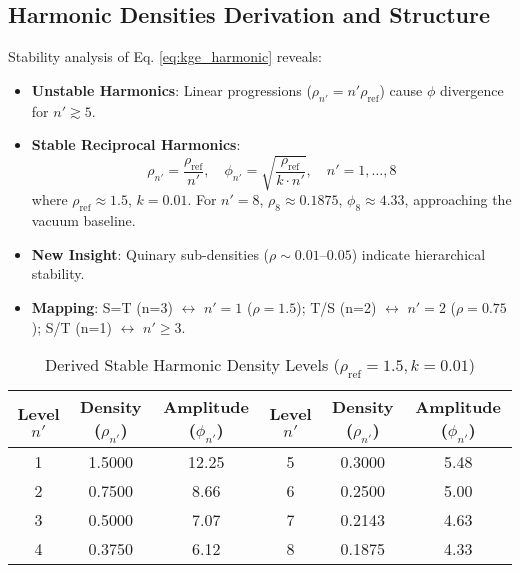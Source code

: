 \documentclass[11pt]{article}
\begin{document}
\subsection{Harmonic Densities Derivation and Structure}
Stability analysis of Eq. \ref{eq:kge_harmonic} reveals:
\begin{itemize}
    \item \textbf{Unstable Harmonics}: Linear progressions (\(\rho_{n'} = n' \rho_{\text{ref}}\)) cause \(\phi\) divergence for \(n' \gtrsim 5\).
    \item \textbf{Stable Reciprocal Harmonics}:
        \begin{equation}
        \rho_{n'} = \frac{\rho_{\text{ref}}}{n'}, \quad \phi_{n'} = \sqrt{\frac{\rho_{\text{ref}}}{k \cdot n'}}, \quad n' = 1, \ldots, 8
        \end{equation}
        where \(\rho_{\text{ref}} \approx 1.5\), \(k = 0.01\). For \(n' = 8\), \(\rho_8 \approx 0.1875\), \(\phi_8 \approx 4.33\), approaching the vacuum baseline.
    \item \textbf{New Insight}: Quinary sub-densities (\(\rho \sim 0.01–0.05\)) indicate hierarchical stability.
    \item \textbf{Mapping}: S=T (n=3) \(\leftrightarrow\) \(n'=1\) (\(\rho = 1.5\)); T/S (n=2) \(\leftrightarrow\) \(n'=2\) (\(\rho = 0.75\)); S/T (n=1) \(\leftrightarrow\) \(n' \geq 3\).
\end{itemize}

\begin{table}[htbp]
    \centering
    \caption{Derived Stable Harmonic Density Levels (\(\rho_{\text{ref}} = 1.5, k = 0.01\))}
    \label{tab:density_levels}
    \begin{tabular}{@{}ccc|ccc@{}}
        \toprule
        Level \(n'\) & Density (\(\rho_{n'}\)) & Amplitude (\(\phi_{n'}\)) & Level \(n'\) & Density (\(\rho_{n'}\)) & Amplitude (\(\phi_{n'}\)) \\
        \midrule
        1 & 1.5000 & 12.25 & 5 & 0.3000 & 5.48 \\
        2 & 0.7500 & 8.66 & 6 & 0.2500 & 5.00 \\
        3 & 0.5000 & 7.07 & 7 & 0.2143 & 4.63 \\
        4 & 0.3750 & 6.12 & 8 & 0.1875 & 4.33 \\
        \bottomrule
    \end{tabular}
\end{table}
\end{document}
